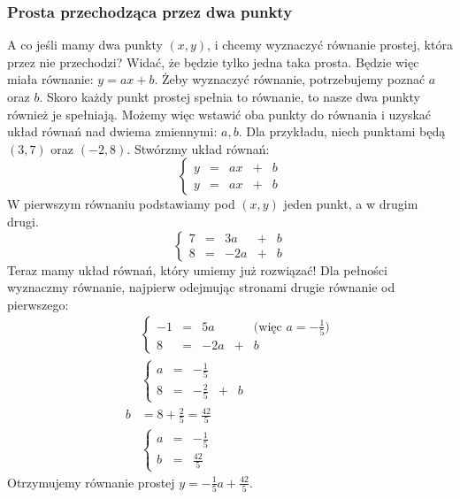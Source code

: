 \documentclass{article}
\theoremstyle{remark}
\begin{document}
\subsubsection{Prosta przechodząca przez dwa punkty}

A co jeśli mamy dwa punkty $(x, y)$, i chcemy wyznaczyć równanie prostej, która przez nie przechodzi?
Widać, że będzie tylko jedna taka prosta. Będzie więc miała równanie: $y=ax+b$.
Żeby wyznaczyć równanie, potrzebujemy poznać $a$ oraz $b$. Skoro każdy punkt prostej
spełnia to równanie, to nasze dwa punkty również je spełniają. Możemy więc wstawić
oba punkty do równania i uzyskać układ równań nad dwiema zmiennymi: $a, b$.
Dla przykładu, niech punktami będą $(3, 7)$ oraz $(-2, 8)$.
Stwórzmy układ równań:
\begin{displaymath}
  \left\{
    \begin{array}{lllll}
      y &=& ax &+& b\\
      y &=& ax &+& b
    \end{array}
  \right.
\end{displaymath}
W pierwszym równaniu podstawiamy pod $(x, y)$ jeden punkt, a w drugim drugi.
\begin{displaymath}
  \left\{
    \begin{array}{lllll}
      7 &=& 3a &+& b\\
      8 &=& -2a &+& b
    \end{array}
  \right.
\end{displaymath}
Teraz mamy układ równań, który umiemy już rozwiązać! Dla pełności wyznaczmy równanie,
najpierw odejmując stronami drugie równanie od pierwszego:
\begin{align*}
  &\left\{
    \begin{array}{lllll}
      -1 &=& 5a && \text{(więc $a=-\frac15$)}\\
      8 &=& -2a &+& b
    \end{array}
  \right.\\
  &\left\{
    \begin{array}{lllll}
      a &=& -\frac15 &&\\[5px]
      8 &=& -\frac25 &+& b
    \end{array}
  \right.\\
  b&=8 + \frac25=\frac{42}5\\
  &\left\{
    \begin{array}{lllll}
      a &=& -\frac15 &&\\[5px]
      b &=& \frac{42}5 &&
    \end{array}
  \right.
\end{align*}
Otrzymujemy równanie prostej $y=-\frac15a + \frac{42}5$.
\end{document}
